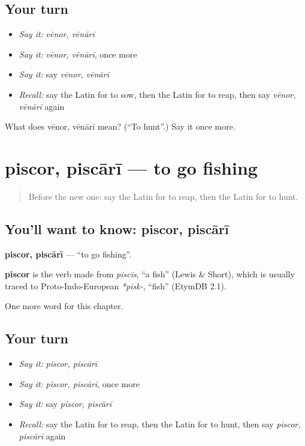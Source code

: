 \subsection*{Your turn}
\begin{itemize}
\raggedright
  \item \emph{Say it:} \emph{vēnor, vēnārī}
  \item \emph{Say it:} \emph{vēnor, vēnārī}, once more
  \item \emph{Say it:} say \emph{vēnor, vēnārī}
  \item \emph{Recall:} say the Latin for to sow, then the Latin for to reap, then say \emph{vēnor, vēnārī} again
\end{itemize}

\begin{tcolorbox}[breakable,colback=teal!4,colframe=teal!35!black,title={Before you move on}]
What does vēnor, vēnārī mean? (\textquotedblleft{}To hunt\textquotedblright{}.) Say it once more.
\end{tcolorbox}
\section[piscor, piscārī]{piscor, piscārī — to go fishing}

\label{lesson:LA-C172-piscor}



\begin{quote}
Before the new one: say the Latin for to reap, then the Latin for to hunt.
\end{quote}

\subsection*{You'll want to know: piscor, piscārī}
\textbf{piscor, piscārī} — \textquotedblleft{}to go fishing\textquotedblright{}.

\begin{cousinweb}
\textbf{piscor} is the verb made from \emph{piscis}, \textquotedblleft{}a fish\textquotedblright{} (Lewis \& Short), which is usually traced to Proto-Indo-European \emph{*pisk-}, \textquotedblleft{}fish\textquotedblright{} (EtymDB 2.1).
\end{cousinweb}

\begin{grammarlens}[title={What you've built}]
One more word for this chapter.
\end{grammarlens}

\subsection*{Your turn}
\begin{itemize}
\raggedright
  \item \emph{Say it:} \emph{piscor, piscārī}
  \item \emph{Say it:} \emph{piscor, piscārī}, once more
  \item \emph{Say it:} say \emph{piscor, piscārī}
  \item \emph{Recall:} say the Latin for to reap, then the Latin for to hunt, then say \emph{piscor, piscārī} again
\end{itemize}

